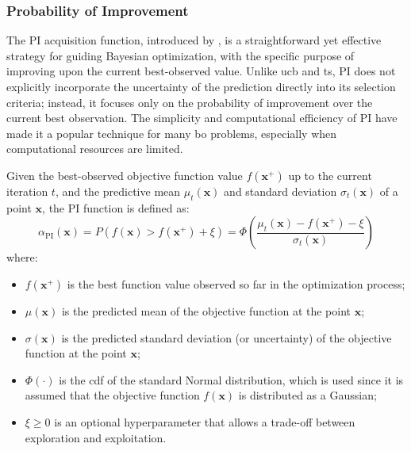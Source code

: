 \subsubsection{Probability of Improvement}
\label{section:pi}

The \ac{PI} acquisition function, introduced by \citet{kushner1964new}, is a straightforward yet effective strategy for guiding Bayesian optimization, with the specific purpose of improving upon the current best-observed value. Unlike \ac{ucb} and \ac{ts}, \ac{PI} does not explicitly incorporate the uncertainty of the prediction directly into its selection criteria; instead, it focuses only on the probability of improvement over the current best observation. The simplicity and computational efficiency of \ac{PI} have made it a popular technique for many \ac{bo} problems, especially when computational resources are limited.

Given the best-observed objective function value \(f(\mathbf{x}^+)\) up to the current iteration $t$, and the predictive mean \(\mu_t(\mathbf{x})\) and standard deviation \(\sigma_t(\mathbf{x})\) of a point \(\mathbf{x}\), the \ac{PI} function is defined as:
\begin{equation*}
\alpha_{\text{PI}}(\mathbf{x}) = P(f(\mathbf{x}) > f(\mathbf{x}^+) + \xi) = \Phi\left( \frac{\mu_t(\mathbf{x}) - f(\mathbf{x}^+) - \xi}{\sigma_t(\mathbf{x})} \right)
\label{eq:pi_formula}
\end{equation*}
where:
\begin{itemize}
    \item \(f(\mathbf{x}^+)\) is the best function value observed so far in the optimization process;
    \item \(\mu(\mathbf{x})\) is the predicted mean of the objective function at the point \(\mathbf{x}\);
    \item \(\sigma(\mathbf{x})\) is the predicted standard deviation (or uncertainty) of the objective function at the point \(\mathbf{x}\);
    \item \(\Phi(\cdot)\) is the \ac{cdf} of the standard Normal distribution, which is used since it is assumed that the objective function \(f(\mathbf{x})\) is distributed as a Gaussian;
    \item \(\xi \geq 0\) is an optional hyperparameter that allows a trade-off between exploration and exploitation. 
\end{itemize}

